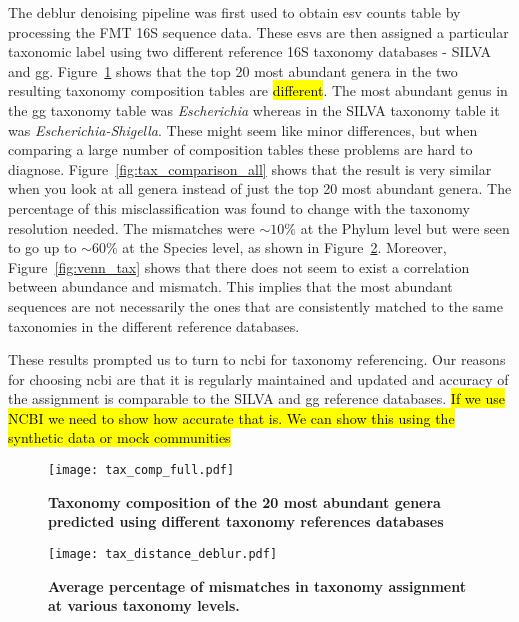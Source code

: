   The deblur denoising pipeline was first used to obtain \ac{esv} counts table by processing the FMT 16S sequence data.
  These \ac{esv}s are then assigned a particular taxonomic label using two different reference 16S taxonomy databases - SILVA and \ac{gg}.
  Figure~\ref{fig:tax_comparison} shows that the top 20 most abundant genera in the two resulting taxonomy composition tables are \hl{different}.
  The most abundant genus in the \ac{gg} taxonomy table was \textit{Escherichia} whereas in the SILVA taxonomy table it was \textit{Escherichia-Shigella}.
  These might seem like minor differences, but when comparing a large number of composition tables these problems are hard to diagnose.
  Figure~\ref{fig:tax_comparison_all} shows that the result is very similar when you look at all genera instead of just the top 20 most abundant genera.
  The percentage of this misclassification was found to change with the taxonomy resolution needed.
  The mismatches were $\sim10\%$ at the Phylum level but were seen to go up to $\sim60\%$ at the Species level, as shown in Figure~\ref{fig:tax_mismatches}.
  Moreover, Figure~\ref{fig:venn_tax} shows that there does not seem to exist a correlation between abundance and mismatch.
  This implies that the most abundant sequences are not necessarily the ones that are consistently matched to the same taxonomies in the different reference databases.

  These results prompted us to turn to \ac{ncbi} for taxonomy referencing.
  Our reasons for choosing \ac{ncbi} are that it is regularly maintained and updated and accuracy of the assignment is comparable to the SILVA and \ac{gg} reference databases.
  \hl{If we use NCBI we need to show how accurate that is. We can show this using the synthetic data or mock communities}

  \begin{figure}[h]
    \centering
    \texttt{[image: tax\_comp\_full.pdf]}
    \caption{\textbf{Taxonomy composition of the 20 most abundant genera predicted using different taxonomy references databases}}
    \label{fig:tax_comparison}
  \end{figure}

  \begin{figure}[h]
    \centering
    \texttt{[image: tax\_distance\_deblur.pdf]}
    \caption{\textbf{Average percentage of mismatches in taxonomy assignment at various taxonomy levels.}}
    \label{fig:tax_mismatches}
  \end{figure}


